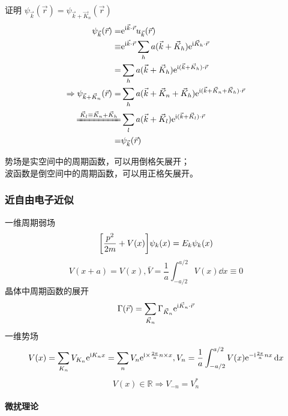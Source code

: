{\color{gray}
        证明 $\psi_{\vec{k}}(\vec{r}) = \psi_{\vec{k} + \vec{K}_n}(\vec{r})$
        \begin{align*}
            \psi_{\vec{k}}(\vec{r}) =                           & \rme^{\rmi \vec{k} \cdot \vec{r}} u_{\vec{k}}(\vec{r})                                                \\
            \equiv                                              & \rme^{\rmi \vec{k} \cdot \vec{r}} \sum_h a(\vec{k} + \vec{K}_h) \rme^{\rmi \vec{K}_h \cdot \vec{r}}   \\
            =                                                   & \sum_h a(\vec{k} + \vec{K}_h) \rme^{\rmi (\vec{k} + \vec{K}_h) \cdot \vec{r}}                         \\
            \Rightarrow \psi_{\vec{k} + \vec{K}_n}(\vec{r}) =   & \sum_h a(\vec{k} + \vec{K}_n + \vec{K}_h) \rme^{\rmi (\vec{k} + \vec{K}_n + \vec{K}_h) \cdot \vec{r}} \\
            \xlongequal{\vec{K}_l \equiv \vec{K}_n + \vec{K}_h} & \sum_l a(\vec{k} + \vec{K}_l) \rme^{\rmi (\vec{k} + \vec{K}_l) \cdot \vec{r}}                         \\
            =                                                   & \psi_{\vec{k}}(\vec{r})
        \end{align*}
    }

\begin{center}
    势场是实空间中的周期函数，可以用倒格矢展开；\\
    波函数是倒空间中的周期函数，可以用正格矢展开。
\end{center}

\subsubsection{近自由电子近似}

一维周期弱场
\[ \qty[\frac{p^2}{2 m} + V(x)]\psi_{k}(x) = E_{k} \psi_{k}(x) \]
\[ V(x + a) = V(x), \bar{V} = \frac{1}{a} \int_{- a / 2}^{a / 2} V(x) \dd{x} \equiv 0 \]
晶体中周期函数的展开
\[ \Gamma(\vec{r}) = \sum_{\vec{K}_n} \Gamma_{\vec{K}_n} \mathrm{e}^{\mathrm{i} \vec{K}_n \cdot \vec{r}} \]
一维势场
\[ V(x) = \sum_{K_n} V_{K_n} \mathrm{e}^{\mathrm{i} K_n x} = \sum_n V_n \mathrm{e}^{\mathrm{i} \times \frac{2 \pi}{a} n \times x}, V_n = \frac{1}{a} \int_{- a / 2}^{a / 2} V(x) \mathrm{e}^{- \mathrm{i} \frac{2 \pi}{a} n x} \dd{x} \]
\[ V(x) \in \mathbb{R} \Rightarrow V_{-n} = V_{n}^* \]

\paragraph{微扰理论}

